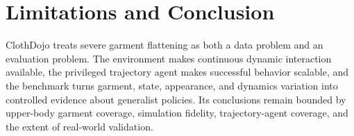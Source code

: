 \section{Limitations and Conclusion}
\label{sec:conclusion}

ClothDojo treats severe garment flattening as both a data problem and an
evaluation problem. The environment makes continuous dynamic interaction
available, the privileged trajectory agent makes successful behavior scalable,
and the benchmark turns garment, state, appearance, and dynamics variation into
controlled evidence about generalist policies. Its conclusions remain bounded
by upper-body garment coverage, simulation fidelity, trajectory-agent coverage,
and the extent of real-world validation.
